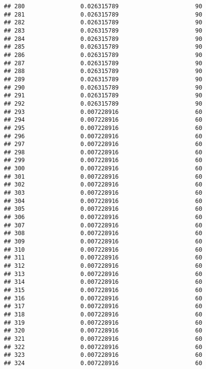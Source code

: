 \documentclass[]{article}
\begin{document}
\begin{verbatim}
## 280                0.026315789                      90
## 281                0.026315789                      90
## 282                0.026315789                      90
## 283                0.026315789                      90
## 284                0.026315789                      90
## 285                0.026315789                      90
## 286                0.026315789                      90
## 287                0.026315789                      90
## 288                0.026315789                      90
## 289                0.026315789                      90
## 290                0.026315789                      90
## 291                0.026315789                      90
## 292                0.026315789                      90
## 293                0.007228916                      60
## 294                0.007228916                      60
## 295                0.007228916                      60
## 296                0.007228916                      60
## 297                0.007228916                      60
## 298                0.007228916                      60
## 299                0.007228916                      60
## 300                0.007228916                      60
## 301                0.007228916                      60
## 302                0.007228916                      60
## 303                0.007228916                      60
## 304                0.007228916                      60
## 305                0.007228916                      60
## 306                0.007228916                      60
## 307                0.007228916                      60
## 308                0.007228916                      60
## 309                0.007228916                      60
## 310                0.007228916                      60
## 311                0.007228916                      60
## 312                0.007228916                      60
## 313                0.007228916                      60
## 314                0.007228916                      60
## 315                0.007228916                      60
## 316                0.007228916                      60
## 317                0.007228916                      60
## 318                0.007228916                      60
## 319                0.007228916                      60
## 320                0.007228916                      60
## 321                0.007228916                      60
## 322                0.007228916                      60
## 323                0.007228916                      60
## 324                0.007228916                      60

\end{verbatim}
\end{document}
